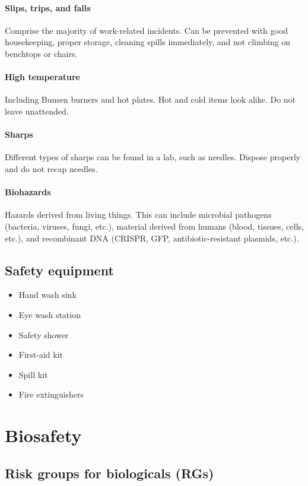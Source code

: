 \documentclass[a4paper, 12pt]{article}
\begin{document}
\paragraph{Slips, trips, and falls} Comprise the majority of work-related incidents. Can be prevented with good housekeeping, proper storage, cleaning spills immediately, and not climbing on benchtops or chairs.

\paragraph{High temperature} Including Bunsen burners and hot plates. Hot and cold items look alike. Do not leave unattended.

\paragraph{Sharps} Different types of sharps can be found in a lab, such as needles. Dispose properly and do not recap needles.

\paragraph{Biohazards} Hazards derived from living things. This can include microbial pathogens (bacteria, viruses, fungi, etc.), material derived from humans (blood, tissues, cells, etc.), and recombinant DNA (CRISPR, GFP, antibiotic-resistant plasmids, etc.).

\subsection*{Safety equipment}
\begin{itemize}
\item Hand wash sink
\item Eye wash station
\item Safety shower
\item First-aid kit
\item Spill kit
\item Fire extinguishers
\end{itemize}

\section*{Biosafety}

\subsection*{Risk groups for biologicals (RGs)}
\end{document}
